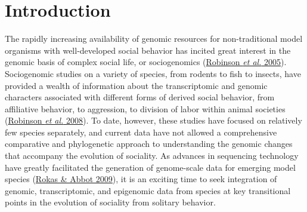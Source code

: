 \section{Introduction}

The rapidly increasing availability of genomic resources for
non-traditional model organisms with well-developed social behavior has
incited great interest in the genomic basis of complex social life, or
sociogenomics (\protect\hyperlink{ux5fENREFux5f49}{Robinson \textit{et
al.} 2005}). Sociogenomic studies on a variety of species, from rodents
to fish to insects, have provided a wealth of information about the
transcriptomic and genomic characters associated with different forms of
derived social behavior, from affiliative behavior, to aggression, to
division of labor within animal societies
(\protect\hyperlink{ux5fENREFux5f48}{Robinson \textit{et al.} 2008}). To
date, however, these studies have focused on relatively few species
separately, and current data have not allowed a comprehensive
comparative and phylogenetic approach to understanding the genomic
changes that accompany the evolution of sociality. As advances in
sequencing technology have greatly facilitated the generation of
genome-scale data for emerging model species
(\protect\hyperlink{ux5fENREFux5f50}{Rokas \& Abbot 2009}), it is an
exciting time to seek integration of genomic, transcriptomic, and
epigenomic data from species at key transitional points in the evolution
of sociality from solitary behavior.

